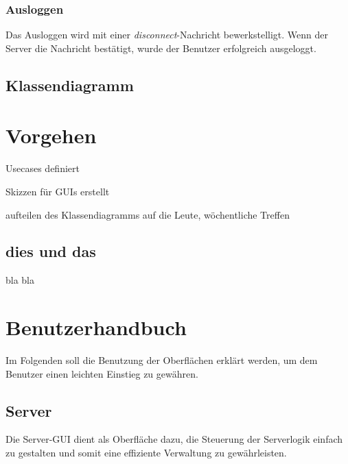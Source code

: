 \documentclass[12pt,a4paper,bibliography=totocnumbered,listof=totocnumbered]{scrartcl}
\begin{document}


\subsubsection{Ausloggen}
Das Ausloggen wird mit einer \textit{disconnect}-Nachricht bewerkstelligt. Wenn der Server die Nachricht bestätigt, wurde der Benutzer erfolgreich ausgeloggt.




\subsection{Klassendiagramm}

\section{Vorgehen}
Usecases definiert

Skizzen für GUIs erstellt

aufteilen des Klassendiagramms auf die Leute, wöchentliche Treffen


\subsection{dies und das}
bla bla


\newpage
\section{Benutzerhandbuch}
Im Folgenden soll die Benutzung der Oberflächen erklärt werden, um dem Benutzer einen leichten Einstieg zu gewähren.
\subsection{Server}
Die Server-GUI dient als Oberfläche dazu, die Steuerung der Serverlogik einfach zu gestalten und somit eine effiziente Verwaltung zu gewährleisten.
\end{document}
